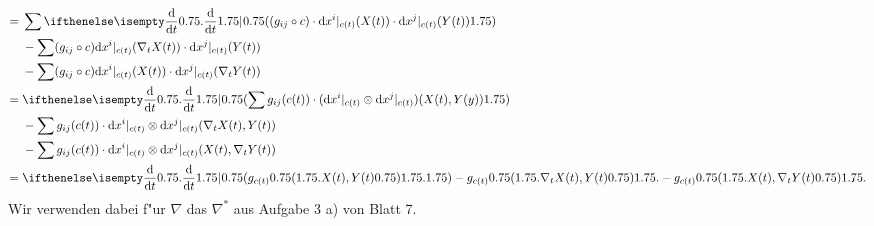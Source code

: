 \begin{description}[font=\normalfont\itshape]
\begin{align*}
		={}& \sum \difffrac{}{t} \left( (g_{ij} \circ c) \cdot \dop x^{i}|_{c(t)} (X(t)) \cdot \dop x^j|_{c(t)} (Y(t)) \right)\\
		 & - \sum (g_{ij} \circ c) \dop x^{i}|_{c(t)} ( \nabla_t X(t)) \cdot \dop x^j|_{c(t)} (Y(t))\\
		 & - \sum (g_{ij} \circ c) \dop x^{i}|_{c(t)} (X(t)) \cdot \dop x^j|_{c(t)} (\nabla_tY(t))\\
		={}& \difffrac{}{t} \left( \sum g_{ij}(c(t)) \cdot (\dop x^{i}|_{c(t)} \otimes \dop x^j|_{c(t)}) (X(t), Y(y)) \right)\\
		 & - \sum g_{ij}(c(t)) \cdot \dop x^{i}|_{c(t)} \otimes \dop x^{j}|_{c(t)} (\nabla_tX(t), Y(t))\\
		 & - \sum g_{ij}(c(t)) \cdot \dop x^{i}|_{c(t)} \otimes \dop x^{j}|_{c(t)} (X(t), \nabla_tY(t))\\
		={}& \difffrac{}{t}\left( g_{c(t)}\big(X(t), Y(t)\big) \right) - g_{c(t)}\big(\nabla_t X(t), Y(t)\big) - g_{c(t)}\big(X(t), \nabla_t Y(t)\big)
	\end{align*}
	Wir verwenden dabei f"ur $\nabla$ das $\nabla^*$ aus Aufgabe 3 a) von Blatt 7.
\end{description}

